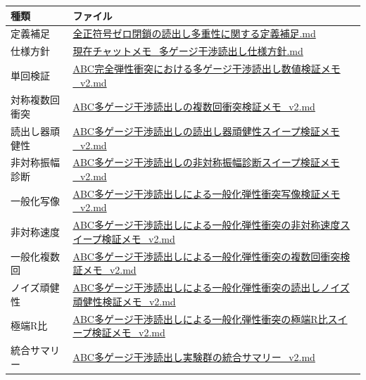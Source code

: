 \documentclass[
  a4paper,
]{article}
\newcounter{none} %
\begin{document}
{\def\LTcaptype{none} %
\begin{longtable}[]{@{}
  >{\raggedright\arraybackslash}p{}
  >{\raggedright\arraybackslash}p{}@{}}
\toprule\noalign{}
\begin{minipage}[b]{\linewidth}\raggedright
種類
\end{minipage} & \begin{minipage}[b]{\linewidth}\raggedright
ファイル
\end{minipage} \\
\midrule\noalign{}
\endhead
\bottomrule\noalign{}
\endlastfoot
定義補足 &
\href{全正符号ゼロ閉鎖の読出し多重性に関する定義補足.md}{全正符号ゼロ閉鎖の読出し多重性に関する定義補足.md} \\
仕様方針 &
\href{現在チャットメモ_多ゲージ干渉読出し仕様方針.md}{現在チャットメモ\_多ゲージ干渉読出し仕様方針.md} \\
単回検証 &
\href{ABC完全弾性衝突における多ゲージ干渉読出し数値検証メモ_v2.md}{ABC完全弾性衝突における多ゲージ干渉読出し数値検証メモ\_v2.md} \\
対称複数回衝突 &
\href{ABC多ゲージ干渉読出しの複数回衝突検証メモ_v2.md}{ABC多ゲージ干渉読出しの複数回衝突検証メモ\_v2.md} \\
読出し器頑健性 &
\href{ABC多ゲージ干渉読出しの読出し器頑健性スイープ検証メモ_v2.md}{ABC多ゲージ干渉読出しの読出し器頑健性スイープ検証メモ\_v2.md} \\
非対称振幅診断 &
\href{ABC多ゲージ干渉読出しの非対称振幅診断スイープ検証メモ_v2.md}{ABC多ゲージ干渉読出しの非対称振幅診断スイープ検証メモ\_v2.md} \\
一般化写像 &
\href{ABC多ゲージ干渉読出しによる一般化弾性衝突写像検証メモ_v2.md}{ABC多ゲージ干渉読出しによる一般化弾性衝突写像検証メモ\_v2.md} \\
非対称速度 &
\href{ABC多ゲージ干渉読出しによる一般化弾性衝突の非対称速度スイープ検証メモ_v2.md}{ABC多ゲージ干渉読出しによる一般化弾性衝突の非対称速度スイープ検証メモ\_v2.md} \\
一般化複数回 &
\href{ABC多ゲージ干渉読出しによる一般化弾性衝突の複数回衝突検証メモ_v2.md}{ABC多ゲージ干渉読出しによる一般化弾性衝突の複数回衝突検証メモ\_v2.md} \\
ノイズ頑健性 &
\href{ABC多ゲージ干渉読出しによる一般化弾性衝突の読出しノイズ頑健性検証メモ_v2.md}{ABC多ゲージ干渉読出しによる一般化弾性衝突の読出しノイズ頑健性検証メモ\_v2.md} \\
極端R比 &
\href{ABC多ゲージ干渉読出しによる一般化弾性衝突の極端R比スイープ検証メモ_v2.md}{ABC多ゲージ干渉読出しによる一般化弾性衝突の極端R比スイープ検証メモ\_v2.md} \\
統合サマリー &
\href{ABC多ゲージ干渉読出し実験群の統合サマリー_v2.md}{ABC多ゲージ干渉読出し実験群の統合サマリー\_v2.md} \\
\end{longtable}
}
\end{document}
